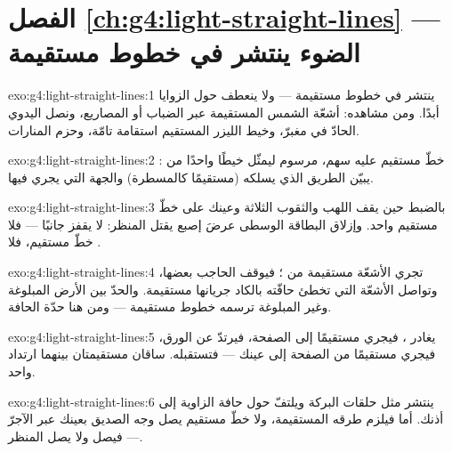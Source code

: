 \section*{الفصل \ref{ch:g4:light-straight-lines} --- الضوء ينتشر في خطوط مستقيمة}

\begin{solution}{exo:g4:light-straight-lines:1}
ينتشر  في خطوط مستقيمة --- ولا ينعطف حول الزوايا أبدًا.
ومن مشاهده: أشعّة الشمس المستقيمة عبر الضباب أو المصاريع، ونصل
 اليدوي الحادّ في  مغبرّ، وخيط الليزر المستقيم
استقامة تامّة، وحزم المنارات.
\end{solution}

\begin{solution}{exo:g4:light-straight-lines:2}
خطّ مستقيم عليه سهم، مرسوم ليمثّل خيطًا واحدًا من : يبيّن
الطريق الذي يسلكه  (مستقيمًا كالمسطرة) والجهة التي يجري
فيها.
\end{solution}

\begin{solution}{exo:g4:light-straight-lines:3}
بالضبط حين يقف اللهب والثقوب الثلاثة وعينك على خطّ مستقيم واحد.
وإزلاق البطاقة الوسطى عرضَ إصبع يقتل المنظر:  لا يقفز
جانبًا --- فلا خطّ مستقيم، فلا .
\end{solution}

\begin{solution}{exo:g4:light-straight-lines:4}
تجري الأشعّة مستقيمة من ؛ فيوقف الحاجب بعضها، وتواصل
الأشعّة التي تخطئ حافّته بالكاد جريانها مستقيمة. والحدّ بين
الأرض المبلوغة وغير المبلوغة ترسمه خطوط مستقيمة --- ومن هنا
حدّة الحافة.
\end{solution}

\begin{solution}{exo:g4:light-straight-lines:5}
يغادر  ، فيجري مستقيمًا إلى الصفحة، فيرتدّ عن
الورق، فيجري مستقيمًا من الصفحة إلى عينك --- فتستقبله. ساقان
مستقيمتان بينهما ارتداد واحد.
\end{solution}

\begin{solution}{exo:g4:light-straight-lines:6}
 ينتشر مثل حلقات البركة ويلتفّ حول حافة الزاوية إلى أذنك.
أما  فيلزم طرقه المستقيمة، ولا خطّ مستقيم يصل وجه الصديق
بعينك عبر الآجرّ --- فيصل  ولا يصل المنظر.
\end{solution}

